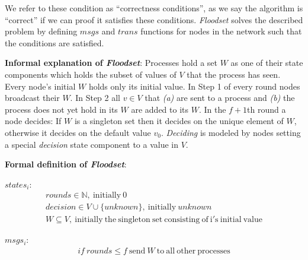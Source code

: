 \documentclass[fleqn]{article}
\begin{document}
We refer to these condition as ``correctness conditions'', as we say the algorithm is ``correct'' if we can proof it satisfies these conditions.  \textit{Floodset} solves the described problem by defining $msgs$ and $trans$ functions for nodes in the network such that the conditions are satisfied.

\textbf{Informal explanation of \textit{Floodset}}: Processes hold a set $W$ as one of their state components which holds the subset of values of $V$ that the process has seen. Every node's initial $W$ holds only its initial value.  In Step 1 of every round nodes broadcast their $W$. In Step 2 all $v \in V$ that \textit{(a)} are sent to a process and \textit{(b)} the process does not yet hold in its $W$ are added to its $W$. In the $f+1$th round a node decides: If $W$ is a singleton set then it decides on the unique element of $W$, otherwise it decides on the default value $v_0$.  \textit{Deciding} is modeled by nodes setting a special \textit{decision} state component to a value in $V$.

\textbf{Formal definition of \textit{Floodset}}:
\begin{mdframed}[backgroundcolor=light-gray, roundcorner=10pt,leftmargin=1, rightmargin=1, innerleftmargin=15, innertopmargin=15,innerbottommargin=15, outerlinewidth=1, linecolor=light-gray]
\noindent $states_i$:
\begin{gather*}
  rounds   \in  \mathbb{N}, \ \mathrm{initially} \ 0 \\
  decision  \in  V \cup \{ unknown \}, \ \mathrm{initially} \ unknown \\
  W \subseteq V, \ \mathrm{initially \ the\  singleton\  set\  consisting\  of\  i's\  initial\  value}
\end{gather*}
\end{mdframed}

\begin{mdframed}[backgroundcolor=light-gray, roundcorner=10pt,leftmargin=1, rightmargin=1, innerleftmargin=15, innertopmargin=15,innerbottommargin=15, outerlinewidth=1, linecolor=light-gray]
\noindent $msgs_i$:
\begin{gather*}
  if\ rounds \le f\ \mathrm{send}\ W\ \mathrm{to\ all\ other\ processes}
\end{gather*}
\end{mdframed}
\end{document}
